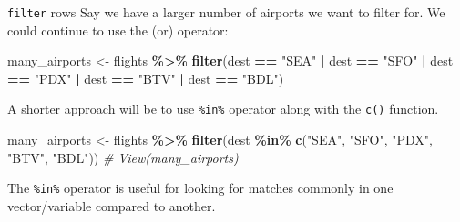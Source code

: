\documentclass[
  ignorenonframetext,
]{beamer}
\newenvironment{Shaded}{\begin{snugshade}}{\end{snugshade}}
\newcommand{\CommentTok}[1]{\textcolor[rgb]{0.56,0.35,0.01}{\textit{#1}}}
\newcommand{\FunctionTok}[1]{\textcolor[rgb]{0.13,0.29,0.53}{\textbf{#1}}}
\newcommand{\NormalTok}[1]{#1}
\newcommand{\OtherTok}[1]{\textcolor[rgb]{0.56,0.35,0.01}{#1}}
\newcommand{\SpecialCharTok}[1]{\textcolor[rgb]{0.81,0.36,0.00}{\textbf{#1}}}
\newcommand{\StringTok}[1]{\textcolor[rgb]{0.31,0.60,0.02}{#1}}
\begin{document}
\begin{frame}[fragile]{\texttt{filter} rows}
\protect\hypertarget{filter-rows-5}{}
Say we have a larger number of airports we want to filter for. We could
continue to use the \texttt{\textbar{}} (or) operator:

\normalsize

\begin{Shaded}
\begin{Highlighting}[]
\NormalTok{many\_airports }\OtherTok{\textless{}{-}}\NormalTok{ flights }\SpecialCharTok{\%\textgreater{}\%} 
  \FunctionTok{filter}\NormalTok{(dest }\SpecialCharTok{==} \StringTok{"SEA"} \SpecialCharTok{|}\NormalTok{ dest }\SpecialCharTok{==} \StringTok{"SFO"} \SpecialCharTok{|}\NormalTok{ dest }\SpecialCharTok{==} \StringTok{"PDX"} \SpecialCharTok{|} 
\NormalTok{         dest }\SpecialCharTok{==} \StringTok{"BTV"} \SpecialCharTok{|}\NormalTok{ dest }\SpecialCharTok{==} \StringTok{"BDL"}\NormalTok{)}
\end{Highlighting}
\end{Shaded}

\normalsize

A shorter approach will be to use \texttt{\%in\%} operator along with
the \texttt{c()} function.

\normalsize

\begin{Shaded}
\begin{Highlighting}[]
\NormalTok{many\_airports }\OtherTok{\textless{}{-}}\NormalTok{ flights }\SpecialCharTok{\%\textgreater{}\%} 
  \FunctionTok{filter}\NormalTok{(dest }\SpecialCharTok{\%in\%} \FunctionTok{c}\NormalTok{(}\StringTok{"SEA"}\NormalTok{, }\StringTok{"SFO"}\NormalTok{, }\StringTok{"PDX"}\NormalTok{, }\StringTok{"BTV"}\NormalTok{, }\StringTok{"BDL"}\NormalTok{))}
\CommentTok{\# View(many\_airports)}
\end{Highlighting}
\end{Shaded}

\normalsize

The \texttt{\%in\%} operator is useful for looking for matches commonly
in one vector/variable compared to another.
\end{frame}
\end{document}
